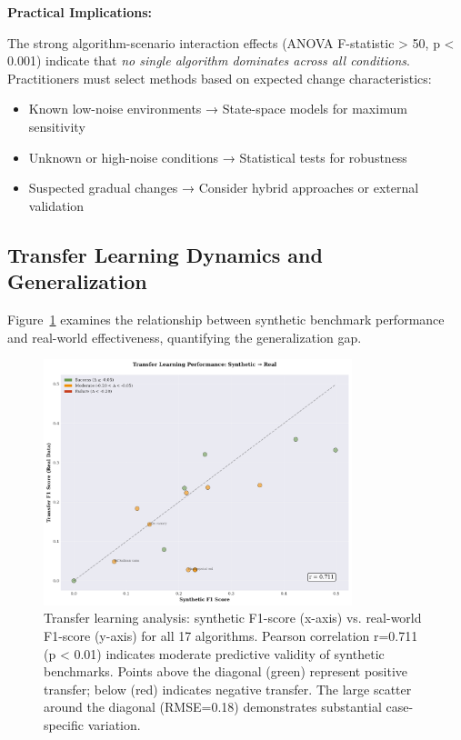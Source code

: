 \textbf{Practical Implications:}

The strong algorithm-scenario interaction effects (ANOVA F-statistic > 50, p < 0.001) indicate that \textit{no single algorithm dominates across all conditions}. Practitioners must select methods based on expected change characteristics:
\begin{itemize}
    \item Known low-noise environments → State-space models for maximum sensitivity
    \item Unknown or high-noise conditions → Statistical tests for robustness
    \item Suspected gradual changes → Consider hybrid approaches or external validation
\end{itemize}


\subsection{Transfer Learning Dynamics and Generalization}

Figure~\ref{fig:transfer_learning_scatter} examines the relationship between synthetic benchmark performance and real-world effectiveness, quantifying the generalization gap.

\begin{figure}[H]
\centering
\includegraphics[width=0.80\textwidth]{figures/fig_transfer_learning_scatter.pdf}
\caption{Transfer learning analysis: synthetic F1-score (x-axis) vs. real-world F1-score (y-axis) for all 17 algorithms. Pearson correlation r=0.711 (p < 0.01) indicates moderate predictive validity of synthetic benchmarks. Points above the diagonal (green) represent positive transfer; below (red) indicates negative transfer. The large scatter around the diagonal (RMSE=0.18) demonstrates substantial case-specific variation.}
\label{fig:transfer_learning_scatter}
\end{figure}


